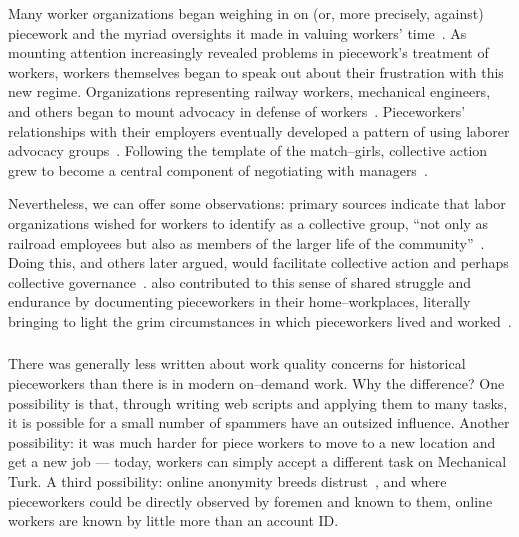 \documentclass[trackingWork]{subfiles}
\begin{document}
Many worker organizations began weighing in on
(or, more precisely, against)
piecework and the myriad oversights it made in valuing workers' time~\cite{american1921problem,richards1904anything}.
As mounting attention increasingly revealed problems in piecework's treatment of workers,
workers themselves began to speak out about their frustration with this new regime.
Organizations representing
railway workers,
mechanical engineers, and
others began to mount advocacy in defense of workers~\cite{american1921problem,richards1904anything}.
Pieceworkers' relationships with their employers eventually developed a pattern of using 
laborer advocacy groups~\cite{levi2009union,ahlquist2013interest,mccallum2013global,jacoby1983union}.
Following the template of the match--girls, collective action grew to become a central component of negotiating with managers~\cite{russell1982collective,olsonlogic}.

Nevertheless, we can offer some observations:
primary sources indicate that labor organizations wished for workers to identify as a collective group, 
``not only as railroad employees but also as members of the larger life of the community''~\cite{american1921problem}.
Doing this, 
\citeauthor{ostrom1990governing} and others later argued,
would facilitate collective action and perhaps collective governance~\cite{ostrom1990governing,russell1982collective,olsonlogic}.
\citeauthor{riisOtherSideLives} also contributed to this sense of shared struggle and endurance
by documenting pieceworkers in their home--workplaces,
literally bringing to light the grim circumstances in which pieceworkers lived and worked~\cite{riisOtherSideLives}.


\subsubsection{\whatchanged}

\begin{comment}
	*workers make little money but love autonomy --- workers make little money
	workers blamed for quality --- ???
	both cases, sociality is hard
	*collective action hard --- collective action succeeded
	- algorithms, not managers
\end{comment}

There was generally less written about work quality concerns for historical pieceworkers than there is in modern on--demand work. 
Why the difference? 
One possibility is that, through writing web scripts and applying them to many tasks, it is possible for a small number of spammers have an outsized influence.
Another possibility: it was much harder for piece workers to move to a new location and get a new job --- today, workers can simply accept a different task on Mechanical Turk.
A third possibility: online anonymity breeds distrust~\cite{friedman2000trust}, and where pieceworkers could be directly observed by foremen and known to them, online workers are known by little more than an account ID.
\end{document}
